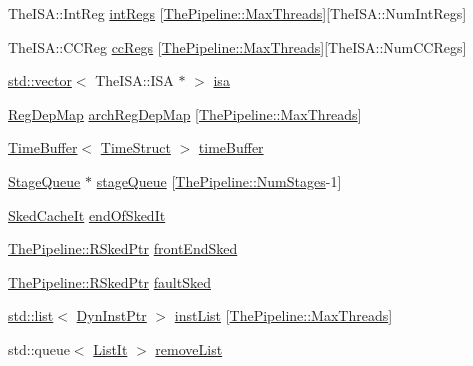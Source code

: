 \begin{DoxyCompactItemize}
\begin{tabbing}
\end{tabbing}\item 
TheISA::IntReg \hyperlink{classInOrderCPU_a66f502f952354c9e141e6de6fd8c1d17}{intRegs} \mbox{[}\hyperlink{namespaceThePipeline_ac9c0bbe9cf27d93e08ea8ccc4096e633}{ThePipeline::MaxThreads}\mbox{]}\mbox{[}TheISA::NumIntRegs\mbox{]}
\item 
TheISA::CCReg \hyperlink{classInOrderCPU_ae25728fd5ca9042b3ef3db1d5f39fccc}{ccRegs} \mbox{[}\hyperlink{namespaceThePipeline_ac9c0bbe9cf27d93e08ea8ccc4096e633}{ThePipeline::MaxThreads}\mbox{]}\mbox{[}TheISA::NumCCRegs\mbox{]}
\item 
\hyperlink{classstd_1_1vector}{std::vector}$<$ TheISA::ISA $\ast$ $>$ \hyperlink{classInOrderCPU_aa0d8dc5e214b94342d1f730e4e34ae82}{isa}
\item 
\hyperlink{classRegDepMap}{RegDepMap} \hyperlink{classInOrderCPU_ab1f63e202ba966be3f297aa2124537a8}{archRegDepMap} \mbox{[}\hyperlink{namespaceThePipeline_ac9c0bbe9cf27d93e08ea8ccc4096e633}{ThePipeline::MaxThreads}\mbox{]}
\item 
\hyperlink{classTimeBuffer}{TimeBuffer}$<$ \hyperlink{structTimeStruct}{TimeStruct} $>$ \hyperlink{classInOrderCPU_ad72b6568a4a40f54d071c31bef16bf2e}{timeBuffer}
\item 
\hyperlink{classTimeBuffer}{StageQueue} $\ast$ \hyperlink{classInOrderCPU_a410cb84ca396b18b7b6cd9b5999bc9c8}{stageQueue} \mbox{[}\hyperlink{namespaceThePipeline_a6918d1731267e5f56969bfb5c240be85}{ThePipeline::NumStages}-\/1\mbox{]}
\item 
\hyperlink{classInOrderCPU_ade41d453959a2fd39fc8e5ddeea16e0e}{SkedCacheIt} \hyperlink{classInOrderCPU_ae38b3e563def292648d9f34e094f8cc8}{endOfSkedIt}
\item 
\hyperlink{classResourceSked}{ThePipeline::RSkedPtr} \hyperlink{classInOrderCPU_a03c10522156687013f75c1bdaa96d04f}{frontEndSked}
\item 
\hyperlink{classResourceSked}{ThePipeline::RSkedPtr} \hyperlink{classInOrderCPU_a74928ed9838a0cd492269c937268ec16}{faultSked}
\item 
\hyperlink{classstd_1_1list}{std::list}$<$ \hyperlink{classRefCountingPtr}{DynInstPtr} $>$ \hyperlink{classInOrderCPU_a407a202e9777af8f3aca683ff7257693}{instList} \mbox{[}\hyperlink{namespaceThePipeline_ac9c0bbe9cf27d93e08ea8ccc4096e633}{ThePipeline::MaxThreads}\mbox{]}
\item 
std::queue$<$ \hyperlink{classInOrderCPU_a184cb829e22cc656acb41864f68f51ea}{ListIt} $>$ \hyperlink{classInOrderCPU_a574cb1bed7660bb2bb6940365f6a3315}{removeList}

\end{DoxyCompactItemize}
